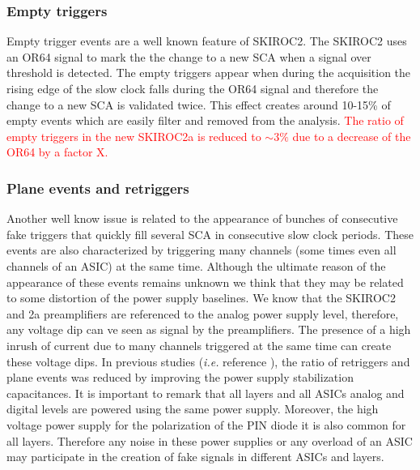 \documentclass[a4paper,11pt]{article}
\newcommand{\todo}[1]{\textcolor{red}{{#1}}}
\begin{document}
\subsubsection*{Empty triggers}

Empty trigger events are a well known feature of SKIROC2. The SKIROC2 uses
an OR64 signal to mark the the change to a new SCA when a signal over threshold is
detected. The empty triggers appear when during
the acquisition the rising edge of the slow clock falls during the OR64 signal
and therefore the change to a new SCA is validated twice.
This effect creates around 10-15\% of empty events which are easily filter and removed from the
analysis. \todo{The ratio of empty triggers in the new SKIROC2a is reduced to $\sim3\%$
  due to a decrease of the OR64 by a factor X.}

\subsubsection*{Plane events and retriggers}

Another well know issue is related to the appearance of bunches of consecutive fake triggers that
quickly fill several SCA in consecutive slow clock periods. These events are also
characterized by triggering many channels (some times even all channels of an ASIC) at the same time.
Although the ultimate reason of the appearance of these events remains unknown we
think that they may be related to some distortion of the
power supply baselines. We know that the SKIROC2 and 2a preamplifiers are referenced to the analog power supply level,
therefore, any voltage dip can ve seen as signal by the preamplifiers. The presence of a high inrush of current
due to many channels triggered at the same time can create these voltage dips.
In previous studies ({\it i.e.} reference \cite{Amjad:2014tha}), the ratio of retriggers and plane events
was reduced by improving the power supply stabilization capacitances. It is important to remark that
all layers and all ASICs analog and digital levels are powered using the same power supply.
Moreover, the high voltage power supply for the polarization of the PIN diode it is also common for all layers.
Therefore any noise in
these power supplies or any overload of an ASIC may participate in the creation of fake signals
in different ASICs and layers.
\end{document}
